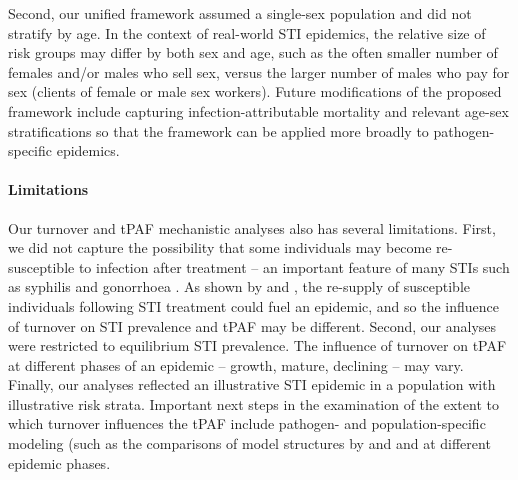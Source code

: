 Second, our unified framework assumed a single-sex population and did not stratify by age.		%
In the context of real-world STI epidemics,
the relative size of risk groups may differ
by both sex and age,
such as the often smaller number of females and/or males who sell sex,
versus the larger number of males who pay for sex (clients of female or male sex workers).
Future modifications of the proposed framework include capturing
infection-attributable mortality and relevant age-sex stratifications so that
the framework can be applied more broadly to pathogen-specific epidemics.

\paragraph{Limitations}		%

Our turnover and tPAF mechanistic analyses also has several limitations.
First, we did not capture the possibility that some individuals may become
re-susceptible to infection after treatment
-- an important feature of many STIs such as syphilis and gonorrhoea
\citep{Fenton2008}.
As shown by \citet{Fenton2008} and \citet{Pourbohloul2003},
the re-supply of susceptible individuals following STI treatment
could fuel an epidemic, and so the influence of turnover on
STI prevalence and tPAF may be different.
Second, our analyses were restricted to equilibrium STI prevalence.
The influence of turnover on tPAF at different phases of an epidemic
-- growth, mature, declining --									%
may vary. Finally, our analyses reflected an illustrative STI epidemic
in a population with illustrative risk strata.
Important next steps in the examination of the extent to which turnover influences the tPAF include
pathogen- and population-specific modeling (such as the comparisons of model structures 
by \citet{Johnson2016} and %
and at different epidemic phases.




